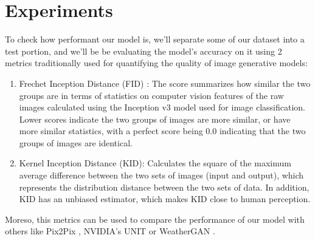 \documentclass[11pt]{article}
\begin{document}
    \section{Experiments}
    To check how performant our model is, we'll separate some of our dataset into a test portion, 
    and we'll be be evaluating the model's accuracy on it using 2 metrics traditionally 
    \cite{https://doi.org/10.48550/arxiv.2206.10935} used for 
    quantifying the quality of image generative models:
    \begin{enumerate}
        \item Frechet Inception Distance (FID) \cite{https://doi.org/10.48550/arxiv.1706.08500}: 
            The score summarizes how similar the two groups are in 
            terms of statistics on computer vision features of the raw images calculated using 
            the Inception v3 model used for image classification. Lower scores indicate the two groups 
            of images are more similar, or have more similar statistics, with a perfect score 
            being 0.0 indicating that the two groups of images are identical.
        \item Kernel Inception Distance (KID): Calculates the square of the maximum average difference 
            between the two sets of images (input  and output), which represents the distribution 
            distance between the two sets of data. In addition, KID has an unbiased estimator, 
            which makes KID close to human perception.
    \end{enumerate}

    Moreso, this metrics can be used to compare the performance of our model with others 
    like Pix2Pix \cite{DBLP:journals/corr/IsolaZZE16}, NVIDIA's UNIT \cite{DBLP:journals/corr/LiuBK17}  
    or WeatherGAN \cite{DBLP:journals/corr/abs-2103-05422}.
\end{document}
